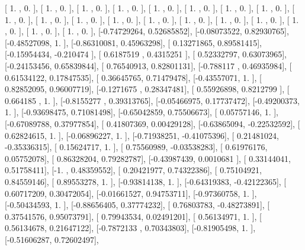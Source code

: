\documentclass{article}
\begin{document}
       [ 1.        ,  0.        ],
       [ 1.        ,  0.        ],
       [ 1.        ,  0.        ],
       [ 1.        ,  0.        ],
       [ 1.        ,  0.        ],
       [ 1.        ,  0.        ],
       [ 1.        ,  0.        ],
       [ 1.        ,  0.        ],
       [ 1.        ,  0.        ],
       [ 1.        ,  0.        ],
       [ 1.        ,  0.        ],
       [ 1.        ,  0.        ],
       [ 1.        ,  0.        ],
       [ 1.        ,  0.        ],
       [ 1.        ,  0.        ],
       [ 1.        ,  0.        ],
       [ 1.        ,  0.        ],
       [ 1.        ,  0.        ],
       [ 1.        ,  0.        ],
       [-0.74729264,  0.52685852],
       [-0.08073522,  0.82930765],
       [-0.48527098,  1.        ],
       [-0.86310081,  0.45963298],
       [ 0.13271865,  0.89581415],
       [-0.15954434, -0.210474  ],
       [ 0.6187519 ,  0.4315251 ],
       [ 0.52332797,  0.63073965],
       [-0.24153456,  0.65839844],
       [ 0.76540913,  0.82801131],
       [-0.788117  ,  0.46935984],
       [ 0.61534122,  0.17847535],
       [ 0.36645765,  0.71479478],
       [-0.43557071,  1.        ],
       [ 0.82852095,  0.96007719],
       [-0.1271675 ,  0.28347481],
       [ 0.55926898,  0.8212799 ],
       [ 0.664185  ,  1.        ],
       [-0.8155277 ,  0.39313765],
       [-0.05466975,  0.17737472],
       [-0.49200373,  1.        ],
       [-0.93698475,  0.71081498],
       [-0.65042859,  0.75506673],
       [ 0.05757146,  1.        ],
       [-0.67089788,  0.37977854],
       [ 0.41807369,  0.00429128],
       [-0.63865094, -0.22532592],
       [ 0.62824615,  1.        ],
       [-0.06896227,  1.        ],
       [-0.71938251, -0.41075396],
       [ 0.21481024, -0.35336315],
       [ 0.15624717,  1.        ],
       [ 0.75560989, -0.03538283],
       [ 0.61976176,  0.05752078],
       [ 0.86328204,  0.79282787],
       [-0.43987439,  0.0010681 ],
       [ 0.33144041,  0.51758411],
       [-1.        ,  0.48359552],
       [ 0.20421977,  0.74322386],
       [ 0.75104921,  0.84559146],
       [ 0.89553278,  1.        ],
       [-0.93814138,  1.        ],
       [-0.64319383, -0.42122365],
       [ 0.60717209,  0.30472054],
       [-0.01661527,  0.94753711],
       [-0.97360758,  1.        ],
       [-0.50434593,  1.        ],
       [-0.88656405,  0.37774232],
       [ 0.76803783, -0.48273891],
       [ 0.37541576,  0.95073791],
       [ 0.79943534,  0.02491201],
       [ 0.56134971,  1.        ],
       [ 0.56134678,  0.21647122],
       [-0.7872133 ,  0.70343803],
       [-0.81905498,  1.        ],
       [-0.51606287,  0.72602497],
\end{document}
